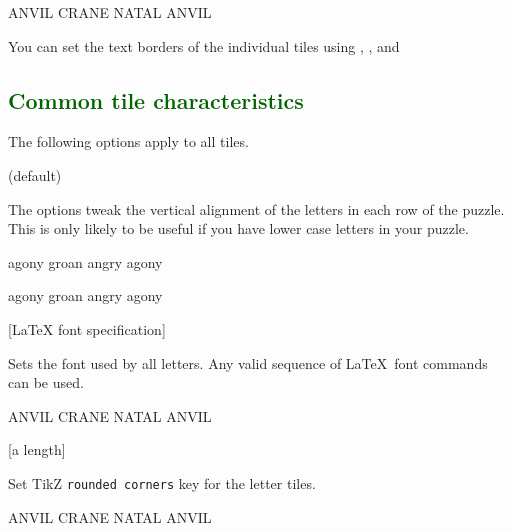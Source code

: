 \documentclass[svgnames]{report}
\newcommand\Section[1]{\subsection{\textcolor{DarkGreen}{#1}}}
\begin{document}
  \begin{example}
  \begin{wordle}[text={red, orange,blue}]{ANVIL}
    CRANE
    NATAL
    ANVIL
  \end{wordle}
  \end{example}

  You can set the text borders of the individual tiles using
  , ,  and 


  \Section{Common tile characteristics}

  The following options apply to all tiles.

   (default) \qquad

  The options tweak the vertical alignment of the letters in each row of
  the puzzle. This is only likely to be useful if you have lower case
  letters in your puzzle.

  \begin{example}
  \begin{wordle}[align]{agony}
     groan
     angry
     agony
  \end{wordle}
  \end{example}

  \begin{example}
  \begin{wordle}[noalign]{agony} %
    groan
    angry
    agony
  \end{wordle}
  \end{example}

       [LaTeX font specification]

  Sets the font used by all  letters. Any valid sequence
  of \LaTeX\ font commands can be used.

  \begin{example}
  \begin{wordle}[font=\large\sffamily]{ANVIL}
    CRANE
    NATAL
    ANVIL
  \end{wordle}
  \end{example}

  [a length]

  Set TikZ \texttt{rounded corners} key for the  letter tiles.

  \begin{example}
  \begin{wordle}[rounded=2mm]{ANVIL}
    CRANE
    NATAL
    ANVIL
  \end{wordle}
  \end{example}
\end{document}
